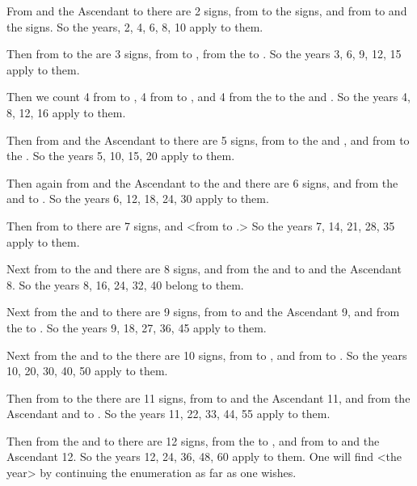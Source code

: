 From \Mars\xspace and the Ascendant to \Jupiter\xspace there are 2 signs, from \Jupiter\xspace to the \Moon\xspace 2 signs, and from \Venus\xspace to \Mercury\xspace and the \Sun\xspace 2 signs. So the years, 2, 4, 6, 8, 10 apply to them.

Then from \Mars\xspace to the \Moon\xspace are 3 signs, from \Saturn\xspace to \Mars\xspace 3, from the \Moon\xspace to \Venus\xspace 3. So the years 3, 6, 9, 12, 15 apply to them.

Then we count 4 from \Saturn\xspace to \Jupiter, 4 from \Jupiter\xspace to \Venus, and 4 from the \Moon\xspace to the \Sun\xspace and \Mercury. So the years 4, 8, 12, 16 apply to them.

Then from \Mars\xspace and the Ascendant to \Venus\xspace there are 5 signs, from \Jupiter\xspace to the \Sun\xspace and \Mercury\xspace 5, and from \Saturn\xspace to the \Moon\xspace 5. So the years 5, 10, 15, 20 apply to them.

Then again from \Mars\xspace and the Ascendant to the \Sun\xspace and \Mercury\xspace there are 6 signs, and from the \Sun\xspace
and \Mercury\xspace to \Saturn\xspace 6. So the years 6, 12, 18, 24, 30 apply to them.

Then from \Saturn\xspace to \Venus\xspace there are 7 signs, and <from \Venus\xspace to \Saturn\xspace 7.> So the years 7, 14, 21, 28, 35 apply to them.

Next from \Saturn\xspace to the \Sun\xspace and \Mercury\xspace there are 8 signs, and from the \Sun\xspace and \Mercury\xspace to \Mars\xspace and the Ascendant 8. So the years 8, 16, 24, 32, 40 belong to them.

Next from the \Sun\xspace and \Mercury\xspace to \Jupiter\xspace there are 9 signs, from \Venus\xspace to \Mars\xspace and the Ascendant 9, and from the \Moon\xspace to \Saturn\xspace 9. So the years 9, 18, 27, 36, 45 apply to them.

Next from the \Sun\xspace and \Mercury\xspace to the \Moon\xspace there are 10 signs, from \Venus\xspace to \Jupiter\xspace 10, and from \Jupiter\xspace to \Saturn\xspace 10. So the years 10, 20, 30, 40, 50 apply to them.

Then from \Venus\xspace to the \Moon\xspace there are 11 signs, from \Moon\xspace to \Mars\xspace and the Ascendant 11, and
from the Ascendant and \Mars\xspace to \Saturn\xspace 11. So the years 11, 22, 33, 44, 55 apply to them.

Then from the \Sun\xspace and \Mercury\xspace to \Venus\xspace there are 12 signs, from the \Moon\xspace to \Jupiter\xspace 12, and from \Jupiter\xspace to \Mars\xspace and the Ascendant 12. So the years 12, 24, 36, 48, 60 apply to them. One will find <the year> by continuing the enumeration as far as one wishes.

